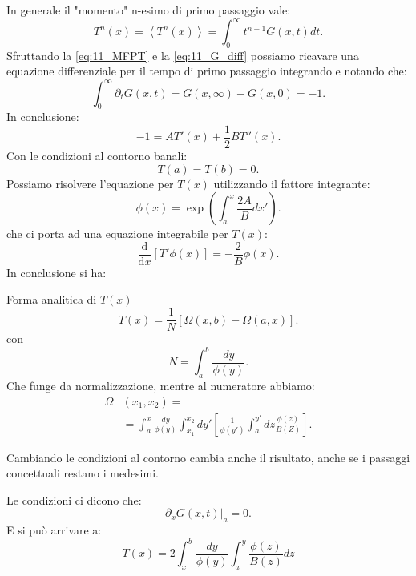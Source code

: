 \noindent
In generale il "momento" n-esimo di primo passaggio vale:
\[
    T^n(x) = \left<T^n(x)\right> = \int_{0}^{\infty} t^{n-1}G(x,t) dt 
.\] 
Sfruttando la \ref{eq:11_MFPT} e la \ref{eq:11_G_diff} possiamo ricavare una equazione differenziale per il tempo di primo passaggio integrando e notando che:
\[
    \int_{0}^{\infty} \partial_{t}G(x,t) = G(x,\infty) -G(x,0) = -1 
.\] 
In conclusione:
\[
    -1 = AT'(x) + \frac{1}{2}BT''(x) 
.\] 
Con le condizioni al contorno banali:
\[
    T(a) =T(b) =0
.\] 
Possiamo risolvere l'equazione per $T(x)$ utilizzando il fattore integrante:
\[
    \phi (x) = \exp\left(\int_{a}^{x} \frac{2A}{B}dx' \right)
.\] 
che ci porta ad una equazione integrabile per $T(x)$:
\[
    \frac{\text{d} }{\text{d} x} \left[T' \phi (x) \right] = - \frac{2}{B}\phi (x) 
.\] 
In conclusione si ha:
\begin{bluebox}{Forma analitica di $T(x)$}
    \[
	T(x) = \frac{1}{N} \left[\Omega (x,b) - \Omega (a,x)\right]
    .\] 
    con 
    \[
	N = \int_{a}^{b} \frac{dy}{\phi (y) }
    .\] 
    Che funge da normalizzazione, mentre al numeratore abbiamo:
    \[\begin{aligned}
	\Omega &(x_1,x_2) = \\
	       & = \int_{a}^{x} \frac{dy}{\phi (y) }  \int_{x_1}^{x_2} dy'\left[\frac{1}{\phi (y') } \int_{a}^{y'} dz \frac{\phi (z)}{B(Z) } 
\right]    .\end{aligned}\]
\end{bluebox}
\noindent
Cambiando le condizioni al contorno cambia anche il risultato, anche se i passaggi concettuali restano i medesimi.
\begin{exmp}
    Le condizioni ci dicono che:
    \[
	\left.\partial_{x}G(x,t) \right|_{a}=0
    .\] 
    E si può arrivare a:
    \begin{equation}
	T(x) = 2 \int_{x}^{b} \frac{dy}{\phi (y)} \int_{a}^{y} \frac{\phi (z) }{B(z) }  dz
	\label{eq:11_T_final}
    \end{equation}
\end{exmp}
\noindent
